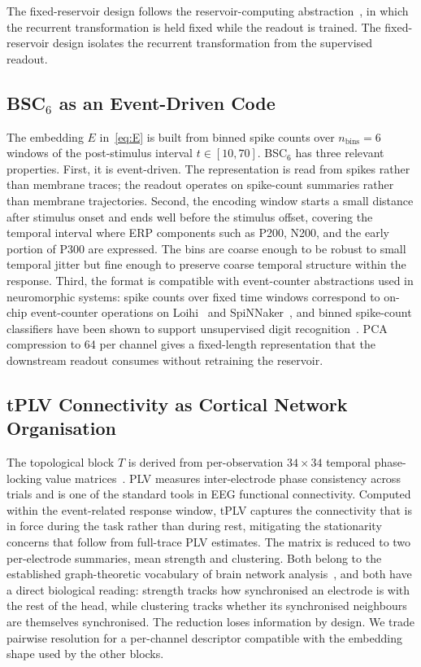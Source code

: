 \documentclass[journal]{IEEEtran}
\begin{document}
The fixed-reservoir design follows the reservoir-computing abstraction~\cite{lukosevicius2009reservoir}, in which the recurrent transformation is held fixed while the readout is trained. The fixed-reservoir design isolates the recurrent transformation from the supervised readout.

\subsection{BSC$_6$ as an Event-Driven Code}
The embedding $E$ in~\eqref{eq:E} is built from binned spike counts over $n_{\text{bins}}=6$ windows of the post-stimulus interval $t\in[10,70]$. BSC$_6$ has three relevant properties. First, it is event-driven. The representation is read from spikes rather than membrane traces; the readout operates on spike-count summaries rather than membrane trajectories. Second, the encoding window starts a small distance after stimulus onset and ends well before the stimulus offset, covering the temporal interval where ERP components such as P200, N200, and the early portion of P300 are expressed. The bins are coarse enough to be robust to small temporal jitter but fine enough to preserve coarse temporal structure within the response. Third, the format is compatible with event-counter abstractions used in neuromorphic systems: spike counts over fixed time windows correspond to on-chip event-counter operations on Loihi~\cite{davies2018loihi} and SpiNNaker~\cite{furber2014spinnaker}, and binned spike-count classifiers have been shown to support unsupervised digit recognition~\cite{diehl2015unsupervised}. PCA compression to 64 per channel gives a fixed-length representation that the downstream readout consumes without retraining the reservoir.

\subsection{tPLV Connectivity as Cortical Network Organisation}
The topological block $T$ is derived from per-observation $34\times34$ temporal phase-locking value matrices~\cite{lachaux1999plv}. PLV measures inter-electrode phase consistency across trials and is one of the standard tools in EEG functional connectivity. Computed within the event-related response window, tPLV captures the connectivity that is in force during the task rather than during rest, mitigating the stationarity concerns that follow from full-trace PLV estimates. The matrix is reduced to two per-electrode summaries, mean strength and clustering. Both belong to the established graph-theoretic vocabulary of brain network analysis~\cite{bullmore2009complex}, and both have a direct biological reading: strength tracks how synchronised an electrode is with the rest of the head, while clustering tracks whether its synchronised neighbours are themselves synchronised. The reduction loses information by design. We trade pairwise resolution for a per-channel descriptor compatible with the embedding shape used by the other blocks.
\end{document}
